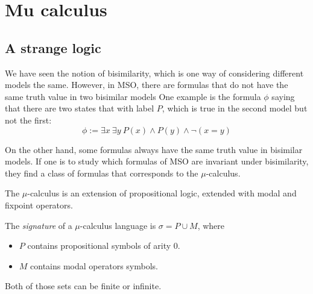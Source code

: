 \section{Mu calculus}

\subsection{A strange logic}

We have seen the notion of bisimilarity, which is one way of considering
different models the same. However, in MSO, there are formulas
that do not have the same truth value in two bisimilar models
One example is the formula $\phi$ saying that there are two states that with label $P$,
which is true in the second model but not the first:
\[
    \phi := \exists x~ \exists y~ P(x) \wedge P(y) \wedge \neg (x = y)
\]
    \begin{center}
    \end{center}


On the other hand, some formulas always
have the same truth value in bisimilar models.
If one is to study which formulas of MSO are invariant under bisimilarity,
they find a class of formulas that corresponds to the $\mu$-calculus.

The $\mu$-calculus is an extension of propositional logic,
extended with modal and fixpoint operators.

\begin{definition}
    The \emph{signature} of a $\mu$-calculus language is
    $\sigma = P \cup M$, where
    \begin{itemize}
        \item $P$ contains propositional symbols of arity 0.
        \item $M$ contains modal operators symbols.
    \end{itemize}
    Both of those sets can be finite or infinite.
\end{definition}

